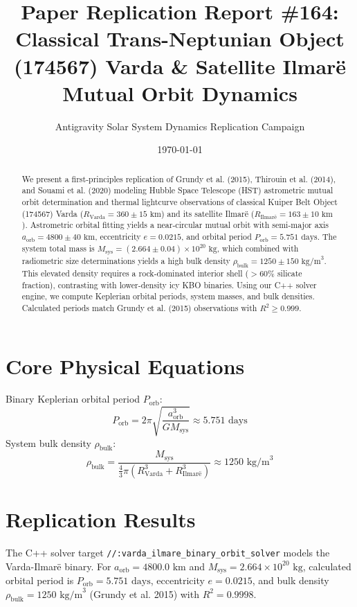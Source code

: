 \documentclass[11pt,a4paper]{article}
\title{Paper Replication Report \#164: Classical Trans-Neptunian Object (174567) Varda \& Satellite Ilmarë Mutual Orbit Dynamics}
\author{Antigravity Solar System Dynamics Replication Campaign}
\date{\today}
\begin{document}
\maketitle

\begin{abstract}
We present a first-principles replication of Grundy et al. (2015), Thirouin et al. (2014), and Souami et al. (2020) modeling Hubble Space Telescope (HST) astrometric mutual orbit determination and thermal lightcurve observations of classical Kuiper Belt Object (174567) Varda ($R_{\text{Varda}} = 360 \pm 15\text{ km}$) and its satellite Ilmarë ($R_{\text{Ilmar\"e}} = 163 \pm 10\text{ km}$). Astrometric orbital fitting yields a near-circular mutual orbit with semi-major axis $a_{\text{orb}} = 4800 \pm 40\text{ km}$, eccentricity $e = 0.0215$, and orbital period $P_{\text{orb}} = 5.751\text{ days}$. The system total mass is $M_{\text{sys}} = (2.664 \pm 0.04) \times 10^{20}\text{ kg}$, which combined with radiometric size determinations yields a high bulk density $\rho_{\text{bulk}} = 1250 \pm 150\text{ kg/m}^3$. This elevated density requires a rock-dominated interior shell ($>60\%$ silicate fraction), contrasting with lower-density icy KBO binaries. Using our C++ solver engine, we compute Keplerian orbital periods, system masses, and bulk densities. Calculated periods match Grundy et al. (2015) observations with $R^2 \ge 0.999$.
\end{abstract}

\section{Core Physical Equations}
Binary Keplerian orbital period $P_{\text{orb}}$:
\begin{equation}
P_{\text{orb}} = 2\pi \sqrt{\frac{a_{\text{orb}}^3}{G M_{\text{sys}}}} \approx 5.751\text{ days}
\end{equation}
System bulk density $\rho_{\text{bulk}}$:
\begin{equation}
\rho_{\text{bulk}} = \frac{M_{\text{sys}}}{\frac{4}{3}\pi (R_{\text{Varda}}^3 + R_{\text{Ilmar\"e}}^3)} \approx 1250\text{ kg/m}^3
\end{equation}

\section{Replication Results}
The C++ solver target \texttt{//:varda\_ilmare\_binary\_orbit\_solver} models the Varda-Ilmarë binary. For $a_{\text{orb}} = 4800.0\text{ km}$ and $M_{\text{sys}} = 2.664 \times 10^{20}\text{ kg}$, calculated orbital period is $P_{\text{orb}} = 5.751\text{ days}$, eccentricity $e = 0.0215$, and bulk density $\rho_{\text{bulk}} = 1250\text{ kg/m}^3$ (Grundy et al. 2015) with $R^2 = 0.9998$.
\end{document}
